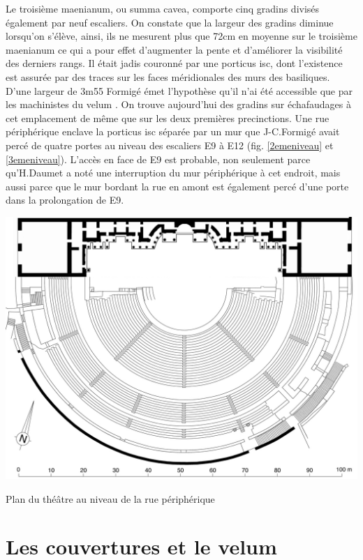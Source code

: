 		Le troisième \gls{maenianum}, ou  \gls{summa cavea}, comporte cinq gradins divisés également par neuf escaliers. On constate que la largeur des gradins diminue lorsqu'on s'élève, ainsi, ils ne mesurent plus que 72cm en moyenne sur le troisième \gls{maenianum} ce qui a pour effet d'augmenter la pente et d'améliorer la visibilité des derniers rangs. Il était jadis couronné par une \gls{porticus isc}, dont l'existence est assurée par des traces sur les faces méridionales des murs des \glspl{basilique}. D'une largeur de 3m55 Formigé émet l'hypothèse qu'il n'ai été accessible que par les machinistes du \gls{velum} \cite{formige}. On trouve aujourd'hui des gradins sur échafaudages à cet emplacement de même que sur les deux premières \glspl{precinction}. Une rue périphérique enclave la \gls{porticus isc} séparée par un mur que J-C.Formigé avait percé de quatre portes au niveau des escaliers E9 à E12 (fig. \ref{2emeniveau} et \ref{3emeniveau}). L'accès en face de E9 est probable, non seulement parce qu'H.Daumet a noté une interruption du mur périphérique à cet endroit, mais aussi parce que le mur bordant la rue en amont est également percé d'une porte dans la prolongation de E9.


	\begin{figureth}
		\includegraphics[width=\linewidth]{images/3emeniveau}
		\caption[Vue de dessus - 3ème niveau]{Plan du théâtre au niveau de la rue périphérique \footnotemark }
		\label{3emeniveau}
	\end{figureth}	
		
\section{Les couvertures et le \gls{velum}}
		
